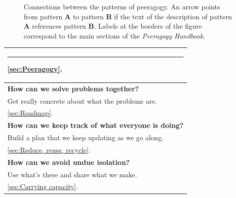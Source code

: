 \begin{figure}
\vspace{-.9in}
{\centering


\par
}
\vspace{-.9in}
\caption{Connections between the patterns of peeragogy.  An arrow points from pattern \textbf{A} to pattern \textbf{B} if the text of the description of pattern \textbf{A} references pattern \textbf{B}.  Labels at the borders of the figure correspond to the main sections of the \emph{Peeragogy Handbook}.\label{fig:connections}}
\end{figure}

\begin{table}
{\footnotesize
{}
\begin{tabularx}{\textwidth}{|C|}
\hline
\rule{\textwidth}{0mm}
 \color{Black} \ref{sec:Peeragogy}. \vspace{.25em}\\
\hline
\vspace{.01em}
\textbf{How can we solve problems together?}\\
Get really concrete about what the problems are.
\vspace{.4em}\\
\hline 
 \color{Black} \ref{sec:Roadmap}. \vspace{.4em}\\
\hline
\vspace{.01em}
\textbf{How can we keep track of what everyone is doing?}\\
Build a plan that we keep updating as we go along.
\vspace{.4em}\\
\hline
 \color{Black} \ref{sec:Reduce, reuse, recycle}. \vspace{.4em}\\
\hline
\vspace{.01em}
\textbf{How can we avoid undue isolation?}\\
Use what's there and share what we make.
\vspace{.4em}\\
\hline
 \color{Black} \ref{sec:Carrying capacity}. \vspace{.4em}\\

\end{tabularx}}
\end{table}
